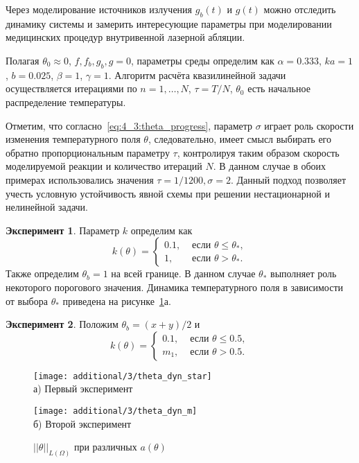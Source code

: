 Через моделирование источников излучения $g_b(t)$ и $g(t)$ можно отследить динамику системы и замерить
интересующие параметры при моделировании медицинских процедур внутривенной лазерной абляции.

Полагая $\theta_0 \approx 0$, $f, f_b, g_b, g = 0$, параметры среды определим как
$\alpha = 0.333$,
$ka = 1$,
$b = 0.025$,
$\beta = 1$,
$\gamma = 1$.
Алгоритм расчёта квазилинейной задачи осуществляется итерациями по $n = 1,\dots, N$, $\tau = T/N$,
$\theta_0$ есть начальное распределение температуры.

\begin{remark}
Отметим, что согласно~\eqref{eq:4_3:theta_progress},
параметр $\sigma$ играет роль скорости изменения температурного поля $\theta$, следовательно,
имеет смысл выбирать его обратно пропорциональным параметру $\tau$,
контролируя таким образом скорость моделируемой реакции и количество итераций $N$.
В данном случае в обоих примерах использовались значения $\tau = 1/1200, \sigma = 2$.
Данный подход позволяет учесть условную
устойчивость явной схемы при решении
нестационарной и нелинейной задачи.
\end{remark}

\textbf{Эксперимент 1}.
Параметр $k$ определим как
\[
    k(\theta)=
    \begin{cases}
        0.1, & \text { если } \theta \leq \theta_{*}, \\
        1, & \text { если } \theta>\theta_{*}.
    \end{cases}
\]
Также определим $\theta_b = 1$ на всей границе.
В данном случае $\theta_{*}$ выполняет роль некоторого порогового значения.
Динамика температурного поля в зависимости от выбора $\theta_*$ приведена
на рисунке~\ref{fig:4_3:theta_dyn_diff}а.


\textbf{Эксперимент 2}.
Положим $\theta_b = (x + y) /2$ и
\[
    k(\theta)=
    \begin{cases}
        0.1, & \text { если } \theta \leq 0.5, \\
        m_1, & \text { если } \theta > 0.5.
    \end{cases}
\]

\begin{figure}[h!t]
    \begin{minipage}[b][][b]{0.49\linewidth}
        \centering
        \texttt{[image: additional/3/theta\_dyn\_star]} \\ а) Первый эксперимент
    \end{minipage}
    \hfill
    \begin{minipage}[b][][b]{0.49\linewidth}
        \centering
        \texttt{[image: additional/3/theta\_dyn\_m]} \\ б) Второй эксперимент
    \end{minipage}
    \caption{$||\theta||_{L(\Omega)}$ при различных $a(\theta)$}
    \label{fig:4_3:theta_dyn_diff}
\end{figure}

